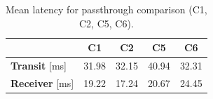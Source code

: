 \begin{table}[H]
    \centering
    \caption{Mean latency for passthrough comparison (C1, C2, C5, C6).}\label{tab:notranscode_latency_summary}
    \begin{tabular}{|l|c|c|c|c|}
    \hline
     & \textbf{C1} & \textbf{C2} & \textbf{C5} & \textbf{C6} \\
    \hline
    \textbf{Transit} [ms]  & 31.98 & 32.15 & 40.94 & 32.31 \\
    \hline
    \textbf{Receiver} [ms] & 19.22 & 17.24 & 20.67 & 24.45 \\
    \hline
    \end{tabular}
\end{table}
